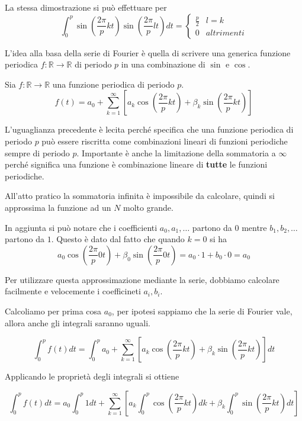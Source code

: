 La stessa dimostrazione si può effettuare per 
$$\int_{0}^{p}\sin (\frac{2\pi}{p}kt)\sin (\frac{2\pi}{p}lt)dt=\begin{cases}
    \frac{p}{2}&l=k\\
    0&altrimenti
\end{cases}$$

L'idea alla basa della serie di Fourier è quella di scrivere una generica funzione 
periodica $f:\mathbb{R}\to \mathbb{R}$ di periodo $p$ in una combinazione di $\sin$
e $\cos$.

\begin{definizione}
    Sia $f:\mathbb{R}\to \mathbb{R}$ una funzione periodica di periodo $p$.
    $$f(t) = a_0 + \sum_{k=1}^{\infty}\left[a_k\cos (\frac{2\pi}{p}kt) +\beta_k\sin(\frac{2\pi}{p}kt)\right]$$
\end{definizione}

L'uguaglianza precedente è lecita perché specifica che una funzione periodica di 
periodo $p$ può essere riscritta come combinazioni lineari di funzioni periodiche 
sempre di periodo $p$. Importante è anche la limitazione della sommatoria a $\infty$
perché significa una funzione è combinazione lineare di \textbf{tutte} le funzioni 
periodiche.

All'atto pratico la sommatoria infinita è impossibile da calcolare, quindi si approssima 
la funzione ad un $N$ molto grande.

In aggiunta si può notare che i coefficienti $a_0, a_1, \dots$ partono da $0$ mentre 
$b_1,b_2,\dots$ partono da $1$. Questo è dato dal fatto che quando $k=0$ si ha 
$$a_0\cos (\frac{2\pi}{p}0t) +\beta_0\sin(\frac{2\pi}{p}0t) = a_0\cdot 1 + b_0\cdot 0 = a_0$$ 

Per utilizzare questa approssimazione mediante la serie, dobbiamo calcolare facilmente e
velocemente i coefficineti $a_i,b_i$.

Calcoliamo per prima cosa $a_0$, per ipotesi sappiamo che la serie di Fourier vale, 
allora anche gli integrali saranno uguali.

\begin{equation*}
    \int_{0}^{p}f(t) dt=\int_{0}^{p} a_0 + \sum_{k=1}^{\infty}\left[a_k\cos (\frac{2\pi}{p}kt) +\beta_k\sin(\frac{2\pi}{p}kt)\right]dt
\end{equation*}

Applicando le proprietà degli integrali si ottiene

\begin{equation*}
    \int_{0}^{p}f(t) dt=a_0\int_{0}^{p} 1dt + \sum_{k=1}^{\infty}\left[a_k\int_{0}^{p}\cos (\frac{2\pi}{p}kt)dk +\beta_k\int_{0}^{p}\sin(\frac{2\pi}{p}kt)dt\right]
\end{equation*}

